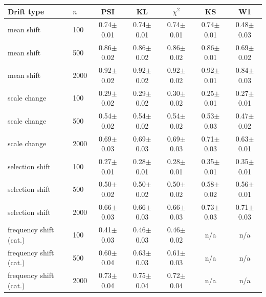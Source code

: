 \begin{tabular}{llccccc}
\toprule
Drift type & $n$ & PSI & KL & $\chi^2$ & KS & W1 \\
\midrule
mean shift & 100 & 0.74$\pm$0.01 & 0.74$\pm$0.01 & 0.74$\pm$0.01 & 0.74$\pm$0.01 & 0.48$\pm$0.03 \\
mean shift & 500 & 0.86$\pm$0.02 & 0.86$\pm$0.02 & 0.86$\pm$0.02 & 0.86$\pm$0.01 & 0.69$\pm$0.02 \\
mean shift & 2000 & 0.92$\pm$0.02 & 0.92$\pm$0.02 & 0.92$\pm$0.02 & 0.92$\pm$0.01 & 0.84$\pm$0.03 \\
scale change & 100 & 0.29$\pm$0.02 & 0.29$\pm$0.02 & 0.30$\pm$0.02 & 0.25$\pm$0.01 & 0.27$\pm$0.01 \\
scale change & 500 & 0.54$\pm$0.02 & 0.54$\pm$0.02 & 0.54$\pm$0.02 & 0.53$\pm$0.03 & 0.47$\pm$0.02 \\
scale change & 2000 & 0.69$\pm$0.03 & 0.69$\pm$0.03 & 0.69$\pm$0.03 & 0.71$\pm$0.03 & 0.63$\pm$0.01 \\
selection shift & 100 & 0.27$\pm$0.01 & 0.28$\pm$0.01 & 0.28$\pm$0.01 & 0.35$\pm$0.01 & 0.35$\pm$0.01 \\
selection shift & 500 & 0.50$\pm$0.02 & 0.50$\pm$0.02 & 0.50$\pm$0.02 & 0.58$\pm$0.02 & 0.56$\pm$0.01 \\
selection shift & 2000 & 0.66$\pm$0.03 & 0.66$\pm$0.03 & 0.66$\pm$0.03 & 0.73$\pm$0.03 & 0.71$\pm$0.03 \\
frequency shift (cat.) & 100 & 0.41$\pm$0.03 & 0.46$\pm$0.03 & 0.46$\pm$0.02 & n/a & n/a \\
frequency shift (cat.) & 500 & 0.60$\pm$0.04 & 0.63$\pm$0.03 & 0.61$\pm$0.03 & n/a & n/a \\
frequency shift (cat.) & 2000 & 0.73$\pm$0.04 & 0.75$\pm$0.04 & 0.72$\pm$0.04 & n/a & n/a \\
\bottomrule
\end{tabular}